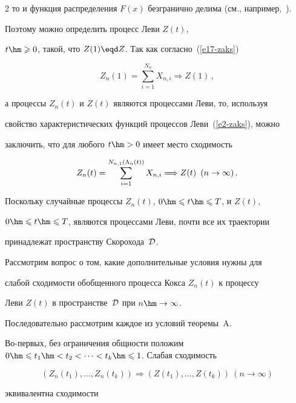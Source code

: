 \begin{multicols}{2}
то и функция распределения $F(x)$ безгранично делима (см., например,~\cite{Feller1984}).

Поэтому можно определить процесс Леви $Z(t)$,

$t\hm\geqslant0$, такой, что $Z(1)\eqd Z$. Так как согласно~(\ref{e17-zaks})

$$

Z_n(1)=\sum\limits_{i=1}^{N_n}X_{n,i}\Longrightarrow Z(1)\,,

$$

а процессы $Z_n(t)$ и $Z(t)$ являются процессами Леви, то, используя

свойство характеристических функций процессов Леви~(\ref{e2-zaks}), можно

заключить, что для любого $t\hm>0$ имеет место сходимость

\begin{equation}

Z_n(t)=\sum\limits_{i=1}^{N_{n,1}(\Lambda_n(t))}X_{n,i}\Longrightarrow Z(t)

\enskip (n\to\infty)\,.\label{e18-zaks}

\end{equation}

Поскольку случайные процессы $Z_n(t)$, $0\hm\leqslant t\hm\leqslant T$, и $Z(t)$,

$0\hm\leqslant t\hm\leqslant T$, являются процессами Леви, почти все их траектории

принадлежат пространству Скорохода~${\cal D}$.



Рассмотрим вопрос о том, какие дополнительные условия нужны для

слабой сходимости обобщенного процесса Кокса $Z_n(t)$ к процессу

Леви $Z(t)$ в пространстве~${\cal D}$ при $n\hm\to\infty$.

Последовательно рассмотрим каждое из условий теоремы~A.



Во-первых, без ограничения общности положим $0\hm\leqslant t_1\hm<t_2<\cdots <t_k

\hm\leqslant 1$. Слабая сходимость

$$

\left(Z_n(t_1),\ldots ,Z_n(t_k)\right)\Longrightarrow

\left(Z(t_1),\ldots ,Z(t_k)\right)\  (n\to\infty)

$$

эквивалентна сходимости


\end{multicols}

